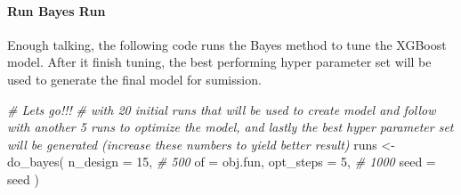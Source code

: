 \documentclass[
]{article}
\newenvironment{Shaded}{\begin{snugshade}}{\end{snugshade}}
\newcommand{\AttributeTok}[1]{\textcolor[rgb]{0.77,0.63,0.00}{#1}}
\newcommand{\CommentTok}[1]{\textcolor[rgb]{0.56,0.35,0.01}{\textit{#1}}}
\newcommand{\ConstantTok}[1]{\textcolor[rgb]{0.00,0.00,0.00}{#1}}
\newcommand{\DecValTok}[1]{\textcolor[rgb]{0.00,0.00,0.81}{#1}}
\newcommand{\FunctionTok}[1]{\textcolor[rgb]{0.00,0.00,0.00}{#1}}
\newcommand{\NormalTok}[1]{#1}
\newcommand{\OtherTok}[1]{\textcolor[rgb]{0.56,0.35,0.01}{#1}}
\newcommand{\SpecialCharTok}[1]{\textcolor[rgb]{0.00,0.00,0.00}{#1}}
\newcommand{\StringTok}[1]{\textcolor[rgb]{0.31,0.60,0.02}{#1}}
\begin{document}
\begin{Shaded}
\end{Shaded}

\hypertarget{run-bayes-run}{%
\paragraph{Run Bayes Run}\label{run-bayes-run}}

Enough talking, the following code runs the Bayes method to tune the
XGBoost model. After it finish tuning, the best performing hyper
parameter set will be used to generate the final model for sumission.

\begin{Shaded}
\begin{Highlighting}[]
\CommentTok{\# Let\textquotesingle{}s go!!! }
\CommentTok{\# with 20 initial runs that will be used to create model and follow with another 5 runs to optimize the model, and lastly the best hyper parameter set will be generated (increase these numbers to yield better result)}
\NormalTok{runs }\OtherTok{\textless{}{-}}
  \FunctionTok{do\_bayes}\NormalTok{(}
    \AttributeTok{n\_design =} \DecValTok{15}\NormalTok{, }\CommentTok{\# 500}
    \AttributeTok{of =}\NormalTok{ obj.fun,}
    \AttributeTok{opt\_steps =} \DecValTok{5}\NormalTok{, }\CommentTok{\# 1000}
    \AttributeTok{seed =}\NormalTok{ seed}
\NormalTok{  )}
\end{Highlighting}
\end{Shaded}
\end{document}
